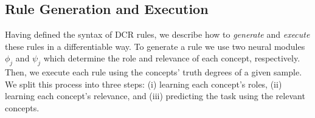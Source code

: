 

\subsection{Rule Generation and Execution}
\label{sec:ruleexec}
Having defined the syntax of DCR rules, we describe how to \textit{generate} and \textit{execute} these rules in a differentiable way. To generate a rule we use two neural modules $\phi_j$ and $\psi_j$ which determine the role and relevance of each concept, respectively. Then, we execute each rule using the concepts' truth degrees of a given sample.
We split this process into three steps: (i) learning each concept's roles, (ii) learning each concept's relevance, and (iii) predicting the task using the relevant concepts.

